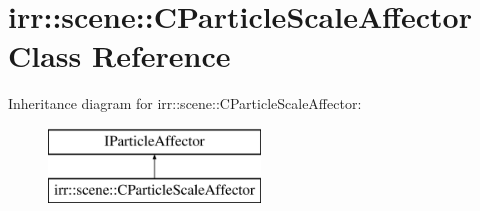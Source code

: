 \hypertarget{classirr_1_1scene_1_1_c_particle_scale_affector}{\section{irr\-:\-:scene\-:\-:C\-Particle\-Scale\-Affector Class Reference}
\label{classirr_1_1scene_1_1_c_particle_scale_affector}
}
Inheritance diagram for irr\-:\-:scene\-:\-:C\-Particle\-Scale\-Affector\-:\begin{figure}[H]
\begin{center}
\leavevmode
\includegraphics[height=2.000000cm]{classirr_1_1scene_1_1_c_particle_scale_affector}
\end{center}
\end{figure}
